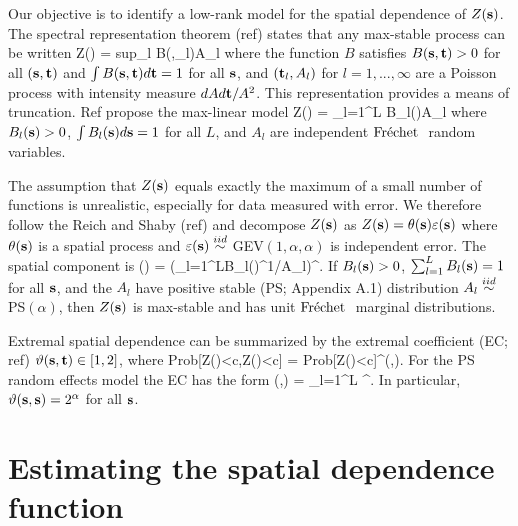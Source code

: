 \documentclass[11pt]{article}
\begin{document}
Our objective is to identify a low-rank model for the spatial dependence of $Z(\mbox{\bf s})$.
The spectral representation theorem (ref) states that any max-stable process can be written
\beq\label{ebeq:spectral}
  Z(\bs) = \mbox{sup}_l B(\bs,\bt_l)A_{l}
\eeq
where the function $B$ satisfies $B(\mbox{\bf s},\mbox{\bf t})>0$ for all $(\mbox{\bf s},\mbox{\bf t})$ and $\int B(\mbox{\bf s},\mbox{\bf t})d\mbox{\bf t}=1$ for all $\mbox{\bf s}$, and $(\mbox{\bf t}_l,A_l)$ for $l=1,...,\infty$ are a Poisson process with intensity measure $dA d\mbox{\bf t}/A^2$.
This representation provides a means of truncation.
Ref propose the max-linear model
\beq\label{ebeq:maxlinear}
Z(\bs) = \bigvee_{l=1}^L B_{l}(\bs)A_l
\eeq
where $B_{l}(\mbox{\bf s})>0$, $\int B_l(\mbox{\bf s})d\mbox{\bf s}=1$ for all $L$, and $A_l$ are independent $\mbox{Fr$\acute{\mbox{e}}$chet }$ random variables.


The assumption that $Z(\mbox{\bf s})$ equals exactly the maximum of a small number of functions is unrealistic, especially for data measured with error.
We therefore follow the Reich and Shaby (ref) and decompose  $Z(\mbox{\bf s})$ as $Z(\mbox{\bf s})=\theta(\mbox{\bf s})\varepsilon(\mbox{\bf s})$ where $\theta(\mbox{\bf s})$ is a spatial process and $\varepsilon(\mbox{\bf s})\stackrel{iid}{\sim}$ GEV$(1,\alpha,\alpha)$ is independent error.
The spatial component is
\beq \label{ebeq:theta}
  \theta(\bs) = \left(\sum_{l=1}^LB_{l}(\bs)^{1/\alpha}A_{l}\right)^{\alpha}.
\eeq
If $B_{l}(\mbox{\bf s})>0$, $\sum_{l=1}^LB_{l}(\mbox{\bf s})=1$ for all $\mbox{\bf s}$, and the $A_{l}$ have positive stable (PS; Appendix A.1) distribution $A_{l}\stackrel{iid}{\sim}$ PS$(\alpha)$, then $Z(\mbox{\bf s})$ is max-stable and has unit $\mbox{Fr$\acute{\mbox{e}}$chet }$ marginal distributions.

Extremal spatial dependence can be summarized by the extremal coefficient (EC; ref) $\vartheta(\mbox{\bf s},\mbox{\bf t})\in[1,2]$, where
\beq\label{ebeq:ECdev}
  \mbox{Prob}[Z(\bs)<c,Z(\bt)<c] = \mbox{Prob}[Z(\bs)<c]^{\vartheta(\bs,\bt)}.
\eeq
For the PS random effects model the EC has the form
\beq\label{ebeq:EC}
   \vartheta(\bs,\bt) = \sum_{l=1}^L ^\alpha.
\eeq
In particular, $\vartheta(\mbox{\bf s},\mbox{\bf s}) = 2^{\alpha}$ for all $\mbox{\bf s}$.

\section{Estimating the spatial dependence function}\label{ebs:estimation}
\end{document}
